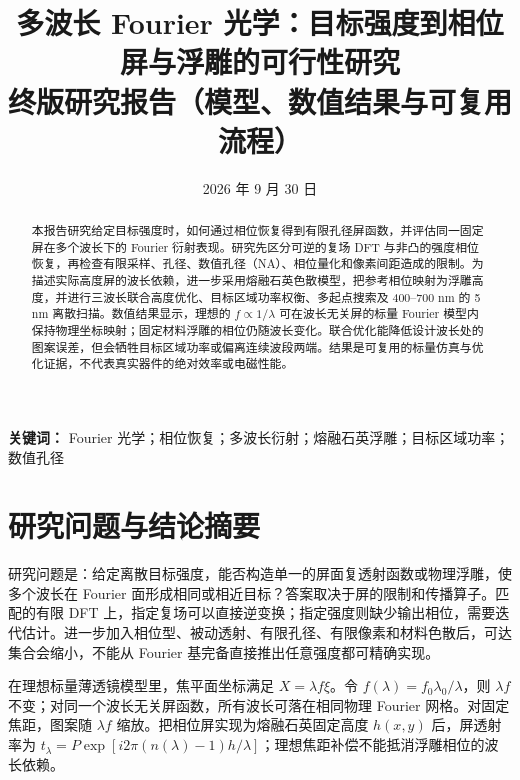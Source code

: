 \documentclass[UTF8,a4paper,11pt,fontset=fandol]{ctexart}
\title{多波长 Fourier 光学：目标强度到相位屏与浮雕的可行性研究\\[0.35em]
\large 终版研究报告（模型、数值结果与可复用流程）}
\author{}
\date{2026 年 9 月 30 日}
\begin{document}
\maketitle

\begin{abstract}
本报告研究给定目标强度时，如何通过相位恢复得到有限孔径屏函数，并评估同一固定屏在多个波长下的 Fourier 衍射表现。研究先区分可逆的复场 DFT 与非凸的强度相位恢复，再检查有限采样、孔径、数值孔径（NA）、相位量化和像素间距造成的限制。为描述实际高度屏的波长依赖，进一步采用熔融石英色散模型，把参考相位映射为浮雕高度，并进行三波长联合高度优化、目标区域功率权衡、多起点搜索及 400--700 nm 的 5 nm 离散扫描。数值结果显示，理想的 $f\propto1/\lambda$ 可在波长无关屏的标量 Fourier 模型内保持物理坐标映射；固定材料浮雕的相位仍随波长变化。联合优化能降低设计波长处的图案误差，但会牺牲目标区域功率或偏离连续波段两端。结果是可复用的标量仿真与优化证据，不代表真实器件的绝对效率或电磁性能。
\end{abstract}

\noindent\textbf{关键词：} Fourier 光学；相位恢复；多波长衍射；熔融石英浮雕；目标区域功率；数值孔径

\clearpage
\tableofcontents
\clearpage

\section{研究问题与结论摘要}

研究问题是：给定离散目标强度，能否构造单一的屏面复透射函数或物理浮雕，使多个波长在 Fourier 面形成相同或相近目标？答案取决于屏的限制和传播算子。匹配的有限 DFT 上，指定复场可以直接逆变换；指定强度则缺少输出相位，需要迭代估计。进一步加入相位型、被动透射、有限孔径、有限像素和材料色散后，可达集合会缩小，不能从 Fourier 基完备直接推出任意强度都可精确实现。

在理想标量薄透镜模型里，焦平面坐标满足 $X=\lambda f\xi$。令 $f(\lambda)=f_0\lambda_0/\lambda$，则 $\lambda f$ 不变；对同一个波长无关屏函数，所有波长可落在相同物理 Fourier 网格。对固定焦距，图案随 $\lambda f$ 缩放。把相位屏实现为熔融石英固定高度 $h(x,y)$ 后，屏透射率为 $t_\lambda=P\exp[i2\pi(n(\lambda)-1)h/\lambda]$；理想焦距补偿不能抵消浮雕相位的波长依赖。
\end{document}
